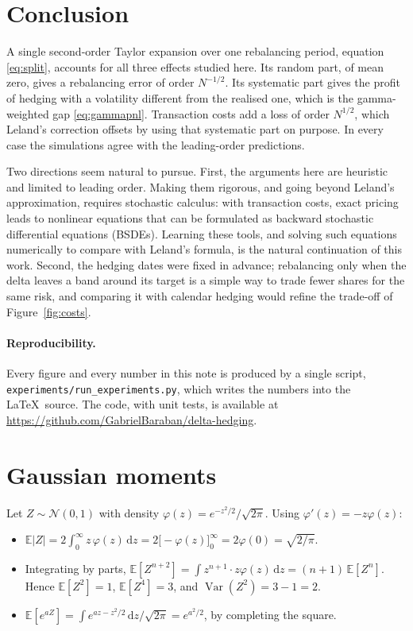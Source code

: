 \documentclass[11pt,a4paper]{article}
\newcommand{\repourl}{https://github.com/GabrielBaraban/delta-hedging}
\newcommand{\E}{\mathbb{E}}
\newcommand{\dd}{\mathrm{d}}
\begin{document}
\section{Conclusion}

A single second-order Taylor expansion over one rebalancing period, equation \eqref{eq:split}, accounts for all three effects studied here. Its random part, of mean zero, gives a rebalancing error of order $N^{-1/2}$. Its systematic part gives the profit of hedging with a volatility different from the realised one, which is the gamma-weighted gap \eqref{eq:gammapnl}. Transaction costs add a loss of order $N^{1/2}$, which Leland's correction offsets by using that systematic part on purpose. In every case the simulations agree with the leading-order predictions.

Two directions seem natural to pursue. First, the arguments here are heuristic and limited to leading order. Making them rigorous, and going beyond Leland's approximation, requires stochastic calculus: with transaction costs, exact pricing leads to nonlinear equations that can be formulated as backward stochastic differential equations (BSDEs). Learning these tools, and solving such equations numerically to compare with Leland's formula, is the natural continuation of this work. Second, the hedging dates were fixed in advance; rebalancing only when the delta leaves a band around its target is a simple way to trade fewer shares for the same risk, and comparing it with calendar hedging would refine the trade-off of Figure~\ref{fig:costs}.

\paragraph{Reproducibility.} Every figure and every number in this note is produced by a single script, \texttt{experiments/run\_experiments.py}, which writes the numbers into the \LaTeX\ source. The code, with unit tests, is available at \url{\repourl}.

\appendix

\section{Gaussian moments}\label{app:gauss}

Let $Z\sim\mathcal N(0,1)$ with density $\varphi(z) = e^{-z^2/2}/\sqrt{2\pi}$. Using $\varphi'(z) = -z\varphi(z)$:
\begin{itemize}
  \item $\E|Z| = 2\int_0^\infty z\,\varphi(z)\,\dd z = 2\big[-\varphi(z)\big]_0^\infty = 2\varphi(0) = \sqrt{2/\pi}$.
  \item Integrating by parts, $\E[Z^{n+2}] = \int z^{n+1}\cdot z\varphi(z)\,\dd z = (n+1)\,\E[Z^n]$. Hence $\E[Z^2] = 1$, $\E[Z^4] = 3$, and $\operatorname{Var}(Z^2) = 3 - 1 = 2$.
  \item $\E[e^{aZ}] = \int e^{az - z^2/2}\,\dd z/\sqrt{2\pi} = e^{a^2/2}$, by completing the square.
\end{itemize}
\end{document}
